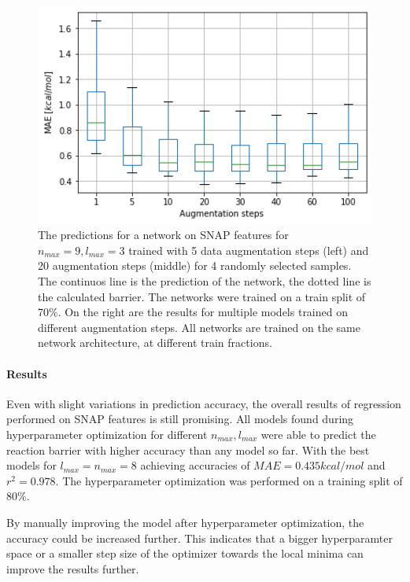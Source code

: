 \begin{figure}[!htb]
    \includegraphics[width=1.0\textwidth]{figures/regression/snap/augmentation.png}
  \endminipage\hfill
  \caption{
  The predictions for a network on SNAP features for $n_{max}=9, l_{max}=3$ trained with 5 data augmentation steps (left) 
  and 20 augmentation steps (middle) for 4 randomly selected samples. 
  The continuos line is the prediction of the network, the dotted line is the calculated barrier.
  The networks were trained on a train split of 70\%.
  On the right are the results for multiple models trained on different augmentation steps.
  All networks are trained on the same network architecture, at different train fractions.
  }
  \label{fig:snap_roation}

\end{figure}


\paragraph{Results}

Even with slight variations in prediction accuracy, the overall results of regression performed on SNAP features is still promising.
All models found during hyperparameter optimization for different $n_{max}, l_{max}$ were able to predict the reaction barrier with higher accuracy than any model so far.
With the best models for $l_{max}=n_{max}=8$ achieving accuracies of $MAE=0.435 kcal/mol$ and $r^2=0.978$.
The hyperparameter optimization was performed on a training split of 80\%.

By manually improving the model after hyperparameter optimization, the accuracy could be increased further.
This indicates that a bigger hyperparamter space or a smaller step size of the optimizer towards the local minima can 
improve the results further.

